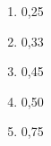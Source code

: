 \documentclass[12pt]{article}
\begin{document}
\begin{multicols}{2}
			\begin{enumerate}[label=(\alph*), noitemsep]
				\item 0,25
				\item 0,33
				\item 0,45
				\item 0,50
				\item 0,75
			\end{enumerate}
		
		
		
		
		
	\end{multicols}
	
\end{document}
